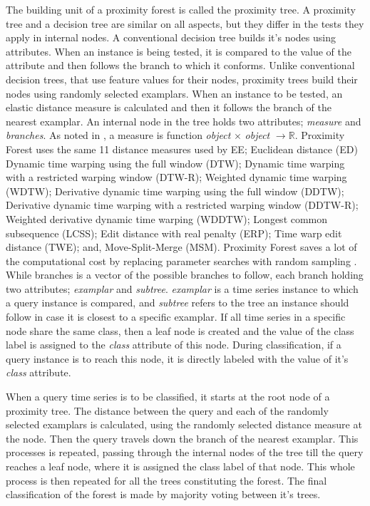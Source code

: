 The building unit of a proximity forest is called the proximity tree. A proximity tree and a decision tree are similar on all aspects,
but they differ in the tests they apply in internal nodes.
A conventional decision tree builds it's nodes using attributes. When an instance is being tested, it is compared to the value of the attribute
and then follows the branch to which it conforms.\newline
Unlike conventional decision trees, that use feature values for their nodes, proximity trees build their nodes using randomly selected examplars.
When an instance to be tested, an elastic distance measure is calculated and then it follows the branch of the nearest examplar.\newline
An internal node in the tree holds two attributes; \emph{measure} and \emph{branches}.
As noted in \cite{lucas2019proximity}, a measure is function \emph{object} $\times$ \emph{object} $\rightarrow\mathbb{R}$.
Proximity Forest uses the same 11 distance measures used by EE; Euclidean distance (ED) Dynamic time warping using the full window (DTW);
Dynamic time warping with a restricted warping window (DTW-R); Weighted dynamic time warping (WDTW);
Derivative dynamic time warping using the full window (DDTW); Derivative dynamic time warping with a restricted warping window (DDTW-R);
Weighted derivative dynamic time warping (WDDTW); Longest common subsequence (LCSS); Edit distance with real penalty (ERP);
Time warp edit distance (TWE); and, Move-Split-Merge (MSM).
Proximity Forest saves a lot of the computational cost by replacing parameter searches with random sampling \cite{fawaz2020inceptiontime,fawaz2019deepreview}.
While branches is a vector of the possible branches to follow, each branch holding two attributes; \emph{examplar} and \emph{subtree}.
\emph{examplar} is a time series instance to which a query instance is compared, and \emph{subtree} refers to the tree an instance should follow
in case it is closest to a specific examplar.\newline
If all time series in a specific node share the same class, then a leaf node is created and the value of the class label is assigned to the \emph{class}
attribute of this node. During classification, if a query instance is to reach this node, it is directly labeled with the value of it's \emph{class} attribute.

When a query time series is to be classified, it starts at the root node of a proximity tree.
The distance between the query and each of the randomly selected examplars is calculated, using the randomly selected distance measure at the node.
Then the query travels down the branch of the nearest examplar. This processes is repeated, passing through the internal nodes of the tree
till the query reaches a leaf node, where it is assigned the class label of that node. This whole process is then repeated for all the trees
constituting the forest. The final classification of the forest is made by majority voting between it's trees.